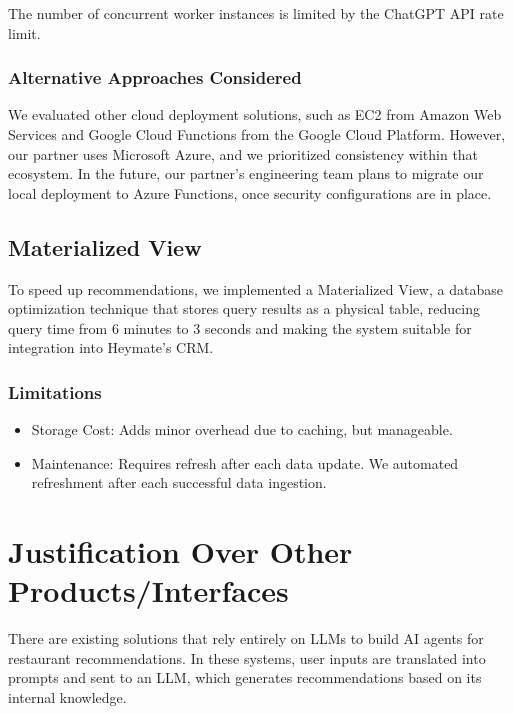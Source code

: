 \documentclass[
  11pt,
  a4paper,
  DIV=11,
  numbers=noendperiod]{scrartcl}
\providecommand{\tightlist}{%
  \setlength{\itemsep}{0pt}\setlength{\parskip}{0pt}}\usepackage{longtable,booktabs,array}
\begin{document}
The number of concurrent worker instances is limited by the ChatGPT API
rate limit.

\subsubsection{Alternative Approaches
Considered}\label{alternative-approaches-considered}

We evaluated other cloud deployment solutions, such as EC2 from Amazon
Web Services and Google Cloud Functions from the Google Cloud Platform.
However, our partner uses Microsoft Azure, and we prioritized
consistency within that ecosystem. In the future, our partner's
engineering team plans to migrate our local deployment to Azure
Functions, once security configurations are in place.

\subsection{Materialized View}\label{materialized-view}

To speed up recommendations, we implemented a Materialized View, a
database optimization technique that stores query results as a physical
table, reducing query time from 6 minutes to 3 seconds and making the
system suitable for integration into Heymate's CRM.

\subsubsection{Limitations}\label{limitations}

\begin{itemize}
\tightlist
\item
  Storage Cost: Adds minor overhead due to caching, but manageable.
\item
  Maintenance: Requires refresh after each data update. We automated
  refreshment after each successful data ingestion.
\end{itemize}

\section{Justification Over Other
Products/Interfaces}\label{justification-over-other-productsinterfaces}

There are existing solutions that rely entirely on LLMs to build AI
agents for restaurant recommendations. In these systems, user inputs are
translated into prompts and sent to an LLM, which generates
recommendations based on its internal knowledge.
\end{document}
